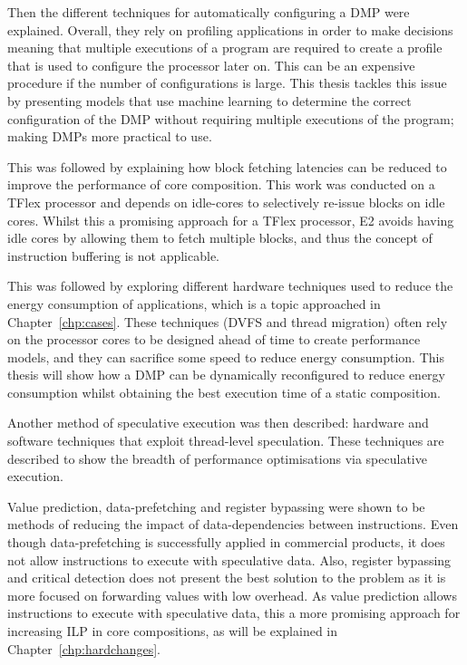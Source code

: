 Then the different techniques for automatically configuring a DMP were explained.
Overall, they rely on profiling applications in order to make decisions meaning that multiple executions of a program are required to create a profile that is used to configure the processor later on.
This can be an expensive procedure if the number of configurations is large.
This thesis tackles this issue by presenting models that use machine learning to determine the correct configuration of the DMP without requiring multiple executions of the program; making DMPs more practical to use.

This was followed by explaining how block fetching latencies can be reduced to improve the performance of core composition.
This work was conducted on a TFlex processor and depends on idle-cores to selectively re-issue blocks on idle cores.
Whilst this a promising approach for a TFlex processor, E2 avoids having idle cores by allowing them to fetch multiple blocks, and thus the concept of instruction buffering is not applicable.

This was followed by exploring different hardware techniques used to reduce the energy consumption of applications, which is a topic approached in Chapter~\ref{chp:cases}.
These techniques (DVFS and thread migration) often rely on the processor cores to be designed ahead of time to create performance models, and they can sacrifice some speed to reduce energy consumption.
This thesis will show how a DMP can be dynamically reconfigured to reduce energy consumption whilst obtaining the best execution time of a static composition.

Another method of speculative execution was then described: hardware and software techniques that exploit thread-level speculation.
These techniques are described to show the breadth of performance optimisations via speculative execution.

Value prediction, data-prefetching and register bypassing were shown to be methods of reducing the impact of data-dependencies between instructions.
Even though data-prefetching is successfully applied in commercial products, it does not allow instructions to execute with speculative data.
Also, register bypassing and critical detection does not present the best solution to the problem as it is more focused on forwarding values with low overhead.
As value prediction allows instructions to execute with speculative data, this a more promising approach for increasing ILP in core compositions, as will be explained in Chapter~\ref{chp:hardchanges}.

